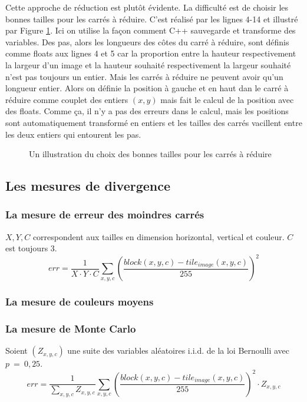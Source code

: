 \documentclass[a4paper]{article}
\begin{document}
Cette approche de r\'eduction est plut\^ot \'evidente. La difficult\'e est de choisir les bonnes tailles pour les carr\'es \`a r\'eduire.
C'est r\'ealis\'e par les lignes 4-14 et illustr\'e par Figure \ref{fig:carres}.
Ici on utilise la fa\c{c}on comment C++ sauvegarde et transforme des variables.
Des pas, alors les longueurs des c\^otes du carr\'e \`a r\'eduire,  sont d\'efinis comme floats aux lignes 4 et 5 car la proportion entre la hauteur respectivement la largeur d'un image et la hauteur souhait\'e respectivement la largeur souhait\'e n'est pas toujours un entier.
Mais les carr\'es \`a r\'eduire ne peuvent avoir qu'un longueur entier.
Alors on d\'efinie la position \`a gauche et en haut   dan le carr\'e \`a r\'eduire comme couplet des entiers $(x,y)$ mais fait le calcul de la position avec des floats.
Comme \c{c}a, il n'y a pas des erreurs dans le calcul, mais les positions sont automatiquement transform\'e en entiers et les tailles des carr\'es vacillent entre les deux entiers qui entourent les pas.
\begin{figure}
  \centerline{}
  \caption{Un illustration du choix des bonnes tailles pour les carr\'es \`a r\'eduire}
  \label{fig:carres}
\end{figure}

\subsection{Les mesures de divergence}
\subsubsection{La mesure de erreur des moindres carr\'es}

$X,Y,C$ correspondent aux tailles en dimension horizontal, vertical et couleur. $C$ est toujours 3. 
\begin{equation}
err=\frac{1}{X\cdot Y\cdot C}\sum_{x,y,c}\left(\frac{block(x,y,c)-tile_{image}(x,y,c)}{255}\right)^2
\end{equation}
\subsubsection{La mesure de couleurs moyens}

\subsubsection{La mesure de Monte Carlo}
Soient $(Z_{x,y,c})$ une suite des variables al\'eatoires i.i.d. de la loi Bernoulli avec $p~=~0,25$.
\begin{equation}
err=\frac{1}{\sum_{x,y,c}Z_{x,y,c}}\sum_{x,y,c}\left(\frac{block(x,y,c)-tile_{image}(x,y,c)}{255}\right)^2\cdot Z_{x,y,c}
\end{equation}
\end{document}
